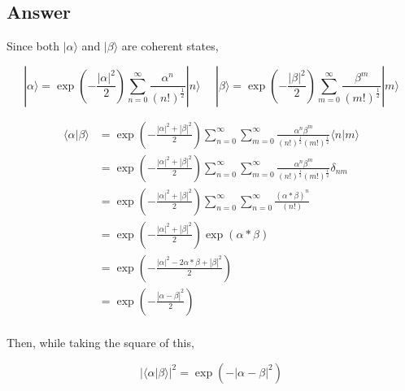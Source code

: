 \documentclass[a4paper,11pt]{article}
\begin{document}
\subsection*{Answer}
\label{sec:org5949911}

Since both \(|\alpha\rangle\) and \(|\beta\rangle\) are coherent states,

$$|\alpha\rangle = \exp\left(-\frac{|\alpha|^2}{2}\right) \sum_{n=0}^{\infty}\frac{\alpha^n}{(n!)^\frac{1}{2}}|n\rangle ~~~~~~|\beta\rangle = \exp\left(-\frac{|\beta|^2}{2}\right) \sum_{m=0}^{\infty}\frac{\beta^m}{(m!)^\frac{1}{2}}|m\rangle$$

\begin{equation*}
\begin{split}
\langle \alpha |\beta \rangle & = \exp\left(-\frac{|\alpha|^2+|\beta|^2}{2}\right) \sum_{n=0}^{\infty}\sum_{m=0}^{\infty}\frac{\alpha^n\beta^m}{(n!)^\frac{1}{2}(m!)^\frac{1}{2}}\langle n | m\rangle \\
& = \exp\left(-\frac{|\alpha|^2+|\beta|^2}{2}\right) \sum_{n=0}^{\infty}\sum_{m=0}^{\infty}\frac{\alpha^n\beta^m}{(n!)^\frac{1}{2}(m!)^\frac{1}{2}}\delta_{nm} \\
& = \exp\left(-\frac{|\alpha|^2+|\beta|^2}{2}\right) \sum_{n=0}^{\infty}\sum_{n=0}^{\infty}\frac{(\alpha*\beta)^n}{(n!)} \\
& = \exp\left(-\frac{|\alpha|^2+|\beta|^2}{2}\right) \exp\left(\alpha*\beta\right)\\
& = \exp\left(-\frac{|\alpha|^2-2\alpha*\beta+|\beta|^2}{2}\right)\\
& = \exp\left(-\frac{|\alpha-\beta|^2}{2}\right)\\
\end{split}
\end{equation*}

Then, while taking the square of this,

$$|\langle \alpha|\beta\rangle |^2=\exp(-|\alpha-\beta|^2)$$
\end{document}
